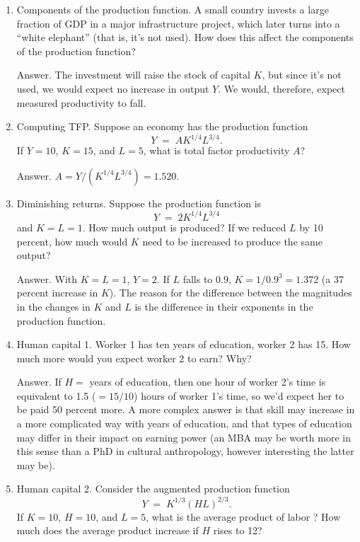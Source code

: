 \setlength{\leftmargini}{.5\oldleftmargini}
\begin{enumerate}

\item Components of the production function.  A small country invests a large fraction of GDP in a major
infrastructure project, which later turns into a ``white elephant''
(that is, it's not used).
How does this affect the components of the
production function?

Answer.
The investment will raise the stock of capital $K$,
but since it's not used, we would expect no increase in output $Y$.
We would, therefore, expect measured productivity to fall.

\item Computing TFP.  Suppose an economy has the production function
\[
    Y \;=\; A K^{1/4} L^{3/4} .
\]
If $ Y= 10$, $K=15$, and $L = 5$,
what is total factor productivity $A$?

Answer.  $ A = Y / (K^{1/4} L^{3/4}) = 1.520$.


\item Diminishing returns.  Suppose the production function is
\[
    Y \;=\; 2 K^{1/4} L^{3/4}
\]
and $K=L = 1$. How much output is produced? If we reduced $L$ by
10 percent, how much would $K$ need to be increased to produce the same
output?

Answer.  With $K=L=1$, $Y = 2$.
If $L$ falls to $0.9$, $K = 1/0.9^3 = 1.372$
(a 37 percent increase in $K$).
The reason for the difference between the magnitudes in the changes in
$K$ and $L$ is the difference in their exponents in the production function.


\item Human capital 1. Worker 1 has ten years of education, worker 2 has 15.  How much
more would you expect worker 2 to earn?  Why?

Answer.  If $H = $ years of education, then one hour of worker 2's
time is equivalent to 1.5 ($=15/10$) hours of worker 1's time, so
we'd expect her to be paid 50 percent more. A more complex answer is
that skill may increase in a more complicated way with years of
education, and that types of education may differ in their impact
on earning power (an MBA may be worth more in this sense than a
PhD in cultural anthropology, however interesting the latter may
be).

\item Human capital  2. Consider the augmented production function
\[
    Y \;=\;  K^{1/3} (HL)^{2/3} .
\]
If $K=10$, $H=10$, and $L=5$, what is the average product of labor
?
How much does the average product increase if $H$ rises to 12?


\end{enumerate}
